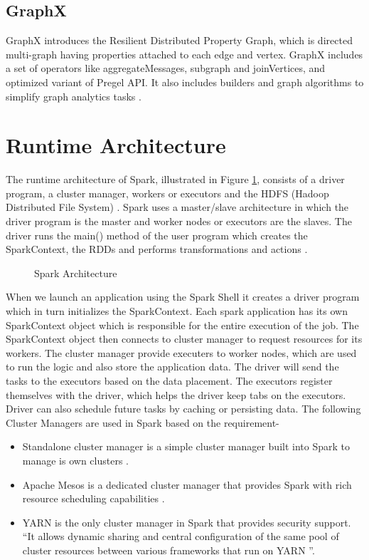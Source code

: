 \documentclass[9pt,twocolumn,twoside]{styles/osajnl}
\begin{document}
\subsection{GraphX}

GraphX introduces the Resilient Distributed Property
Graph, which is directed multi-graph having properties
attached to each edge and vertex. GraphX includes a set of
operators like aggregateMessages, subgraph and
joinVertices, and optimized variant of Pregel API. It also
includes builders and graph algorithms to simplify graph
analytics tasks \cite{article-spark-1}.

\section{Runtime Architecture}

The runtime architecture of Spark,  illustrated in Figure \ref{fig:spark-runtime}, consists of a driver program, a cluster manager, workers or executors and the HDFS (Hadoop Distributed File System) \cite{article-spark-1}.
Spark uses a master/slave architecture in which the driver program is the master and worker nodes or executors are the slaves. The driver runs the main() method of the user program which creates  the SparkContext, the RDDs and performs transformations and actions \cite{book-spark}.

\begin{figure}[htbp]
\centering
{}
\caption{Spark Architecture \cite{www-spark-cluster}}
\label{fig:spark-runtime}
\end{figure}

When we launch an application using the Spark Shell it creates a driver program which in turn initializes the SparkContext. Each spark application has its own SparkContext object which is responsible for the entire execution of the job. The SparkContext  object then connects to cluster manager to request resources for its workers. The cluster manager provide executers to worker nodes, which are used to run the logic and also store the application data. The driver will send the tasks to the executors based on the data placement. The executors register themselves with the driver, which helps the driver keep tabs on the executors. Driver can also schedule future tasks by caching or persisting data.
The following Cluster Managers are used in Spark based on the requirement-
\begin{itemize}
    \item Standalone cluster manager is a simple cluster manager built into Spark to manage is own clusters \cite{www-spark-cluster}.
    \item Apache Mesos is a dedicated cluster manager that provides Spark with rich resource scheduling capabilities \cite{www-spark-cluster}.
    \item YARN is the only cluster manager in Spark that provides security support. “It allows dynamic sharing and central configuration of the same pool of cluster resources between various frameworks that run on YARN \cite{www-spark-2}”.
\end{itemize}
\end{document}
